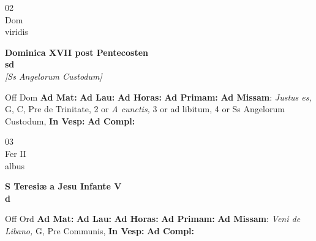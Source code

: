 \documentclass[10pt, openany]{book}
\begin{document}
    \begin{center}
        \begin{minipage}{3.5in}
            \vspace{2em}
            \begin{minipage}{0.5in}
                {\Huge 02} \\
                {\normalsize Dom} \\
                {\normalsize viridis}
            \end{minipage}
            \begin{minipage}{3.0in}
                \textbf{ \large Dominica XVII post Pentecosten \\
                \textnormal{\normalsize sd}} \\ \textit{[Ss Angelorum Custodum]} \\ 
            \end{minipage}
            \begin{justify}Off Dom
                \textbf{Ad Mat: }
                \textbf{Ad Lau: }
                \textbf{Ad Horas: }
                \textbf{Ad Primam: }\textbf{Ad Missam}: \textit{Justus es,} G, C, Pre de Trinitate, 2 or \textit{A cunctis,} 3 or ad libitum, 4 or Ss Angelorum Custodum,  
                \textbf{In Vesp: }
                \textbf{Ad Compl: }
            \end{justify}
        \end{minipage}
    \end{center}

    \begin{center}
        \begin{minipage}{3.5in}
            \vspace{2em}
            \begin{minipage}{0.5in}
                {\Huge 03} \\
                {\normalsize Fer II} \\
                {\normalsize albus}
            \end{minipage}
            \begin{minipage}{3.0in}
                \textbf{ \large S Teresiæ a Jesu Infante V \\
                \textnormal{\normalsize d}} \\ 
            \end{minipage}
            \begin{justify}Off Ord
                \textbf{Ad Mat: }
                \textbf{Ad Lau: }
                \textbf{Ad Horas: }
                \textbf{Ad Primam: }\textbf{Ad Missam}: \textit{Veni de Libano,} G, Pre Communis,  
                \textbf{In Vesp: }
                \textbf{Ad Compl: }
            \end{justify}
        \end{minipage}
    \end{center}
\end{document}
